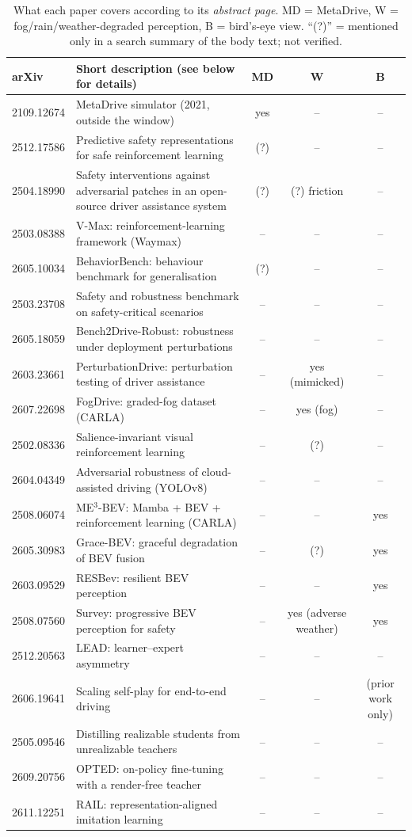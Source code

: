 \begin{table}[H]\centering\small
\caption{What each paper covers according to its \emph{abstract page}. MD = MetaDrive, W = fog/rain/weather-degraded perception, B = bird's-eye view. ``(?)'' = mentioned only in a search summary of the body text; not verified.}\label{tab:related}
\begin{tabularx}{\textwidth}{@{}lXccc@{}}\toprule
arXiv & Short description (see below for details) & MD & W & B\\\midrule
2109.12674 & MetaDrive simulator (2021, outside the window) & yes & -- & --\\
2512.17586 & Predictive safety representations for safe reinforcement learning & (?) & -- & --\\
2504.18990 & Safety interventions against adversarial patches in an open-source driver assistance system & (?) & (?) friction & --\\
2503.08388 & V-Max: reinforcement-learning framework (Waymax) & -- & -- & --\\
2605.10034 & BehaviorBench: behaviour benchmark for generalisation & (?) & -- & --\\
2503.23708 & Safety and robustness benchmark on safety-critical scenarios & -- & -- & --\\
2605.18059 & Bench2Drive-Robust: robustness under deployment perturbations & -- & -- & --\\
2603.23661 & PerturbationDrive: perturbation testing of driver assistance & -- & yes (mimicked) & --\\
2607.22698 & FogDrive: graded-fog dataset (CARLA) & -- & yes (fog) & --\\
2502.08336 & Salience-invariant visual reinforcement learning & -- & (?) & --\\
2604.04349 & Adversarial robustness of cloud-assisted driving (YOLOv8) & -- & -- & --\\
2508.06074 & ME$^3$-BEV: Mamba + BEV + reinforcement learning (CARLA) & -- & -- & yes\\
2605.30983 & Grace-BEV: graceful degradation of BEV fusion & -- & (?) & yes\\
2603.09529 & RESBev: resilient BEV perception & -- & -- & yes\\
2508.07560 & Survey: progressive BEV perception for safety & -- & yes (adverse weather) & yes\\
2512.20563 & LEAD: learner--expert asymmetry & -- & -- & --\\
2606.19641 & Scaling self-play for end-to-end driving & -- & -- & (prior work only)\\
2505.09546 & Distilling realizable students from unrealizable teachers & -- & -- & --\\
2609.20756 & OPTED: on-policy fine-tuning with a render-free teacher & -- & -- & --\\
2611.12251 & RAIL: representation-aligned imitation learning & -- & -- & --\\\bottomrule
\end{tabularx}
\end{table}

